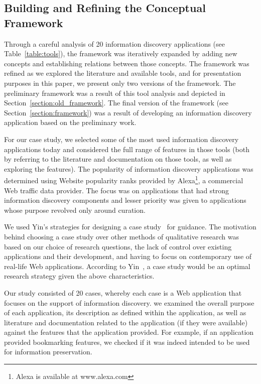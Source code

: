 \documentclass{sigchi}
\begin{document}
{\subsection{Building and Refining the Conceptual Framework}
\label{section:building}
Through a careful analysis of 20 information discovery applications (see Table~\ref{table:tools}), the framework was iteratively expanded by adding new concepts and establishing relations between those concepts.  The framework was refined as we explored the literature and available tools, and for presentation purposes in this paper, we present only two versions of the framework. The preliminary framework was a result of this tool analysis and depicted in Section~\ref{section:old_framework}. The final version of the framework (see Section~\ref{section:framework}) was a result of developing an information discovery application based on the preliminary work.    

For our case study, we selected some of the most used information discovery applications today and considered the full range of features in those tools (both by referring to the literature and documentation on those tools, as well as exploring the features). The popularity of information discovery applications was determined using Website popularity ranks provided by Alexa\footnote[1]{Alexa is available at www.alexa.com}, a commercial Web traffic data provider. The focus was on applications that had strong information discovery components and lesser priority was given to applications whose purpose revolved only around curation.

We used Yin's strategies for designing a case study~\cite{yin2014case} for guidance. The motivation behind choosing a case study over other methods of qualitative research was based on our choice of research questions, the lack of control over existing applications and their development, and having to focus on contemporary use of real-life Web applications. According to Yin~\cite{yin2014case}, a case study would be an optimal research strategy given the above characteristics.

Our study consisted of 20 cases, whereby each case is a Web application that focuses on the support of information discovery. we examined the overall purpose of each application, its description as defined within the application, as well as literature and documentation related to the application (if they were available) against the features that the application provided. For example, if an application provided bookmarking features, we checked if it was indeed intended to be used for information preservation. 

}
\end{document}
